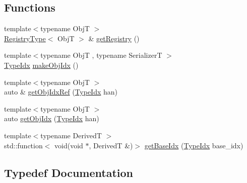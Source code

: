\subsection*{Functions}
\begin{DoxyCompactItemize}
\item 
{\footnotesize template$<$typename ObjT $>$ }\\\hyperlink{namespacecheckpoint_1_1dispatch_1_1vrt_1_1serializer__registry_a93af9f3c271f2e1356cdaf8944831cc3}{Registry\+Type}$<$ ObjT $>$ \& \hyperlink{namespacecheckpoint_1_1dispatch_1_1vrt_1_1serializer__registry_a7f17fa17c2a8d9b7961e5877ab23eb44}{get\+Registry} ()
\item 
{\footnotesize template$<$typename ObjT , typename SerializerT $>$ }\\\hyperlink{namespacecheckpoint_1_1dispatch_1_1vrt_acd3f9e6b091bcfbc23dc35ea8ef45d3b}{Type\+Idx} \hyperlink{namespacecheckpoint_1_1dispatch_1_1vrt_1_1serializer__registry_ab059eccb4c15860ca2cc1e07aef2a8cc}{make\+Obj\+Idx} ()
\item 
{\footnotesize template$<$typename ObjT $>$ }\\auto \& \hyperlink{namespacecheckpoint_1_1dispatch_1_1vrt_1_1serializer__registry_a41f585b6e7eefc6c008d2fef6cf0d204}{get\+Obj\+Idx\+Ref} (\hyperlink{namespacecheckpoint_1_1dispatch_1_1vrt_acd3f9e6b091bcfbc23dc35ea8ef45d3b}{Type\+Idx} han)
\item 
{\footnotesize template$<$typename ObjT $>$ }\\auto \hyperlink{namespacecheckpoint_1_1dispatch_1_1vrt_1_1serializer__registry_a499ff0bece26be083fcdd66c59c79a22}{get\+Obj\+Idx} (\hyperlink{namespacecheckpoint_1_1dispatch_1_1vrt_acd3f9e6b091bcfbc23dc35ea8ef45d3b}{Type\+Idx} han)
\item 
{\footnotesize template$<$typename DerivedT $>$ }\\std\+::function$<$ void(void $\ast$, DerivedT \&)$>$ \hyperlink{namespacecheckpoint_1_1dispatch_1_1vrt_1_1serializer__registry_afa0cfe7922654b628c231e5e141ac671}{get\+Base\+Idx} (\hyperlink{namespacecheckpoint_1_1dispatch_1_1vrt_acd3f9e6b091bcfbc23dc35ea8ef45d3b}{Type\+Idx} base\+\_\+idx)
\end{DoxyCompactItemize}


\subsection{Typedef Documentation}
\mbox{\label{namespacecheckpoint_1_1dispatch_1_1vrt_1_1serializer__registry_a93af9f3c271f2e1356cdaf8944831cc3}} 
